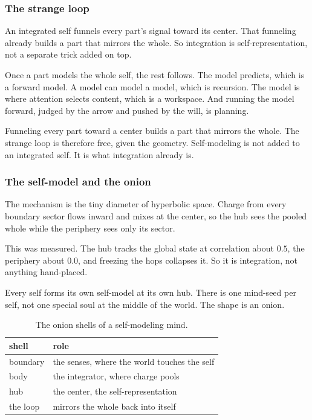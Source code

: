 \subsubsection{The strange loop}

An integrated self funnels every part's signal toward its center. That funneling already builds a part that mirrors the whole. So integration is self-representation, not a separate trick added on top.

Once a part models the whole self, the rest follows. The model predicts, which is a forward model. A model can model a model, which is recursion. The model is where attention selects content, which is a workspace. And running the model forward, judged by the arrow and pushed by the will, is planning.

\begin{principle}
Funneling every part toward a center builds a part that mirrors the whole. The strange loop is therefore free, given the geometry. Self-modeling is not added to an integrated self. It is what integration already is.
\end{principle}

\subsubsection{The self-model and the onion}

The mechanism is the tiny diameter of hyperbolic space. Charge from every boundary sector flows inward and mixes at the center, so the hub sees the pooled whole while the periphery sees only its sector.

This was measured. The hub tracks the global state at correlation about $0.5$, the periphery about $0.0$, and freezing the hops collapses it. So it is integration, not anything hand-placed.

Every self forms its own self-model at its own hub. There is one mind-seed per self, not one special soul at the middle of the world. The shape is an onion.

\begin{table}[ht]
\centering
\begin{tabular}{@{}ll@{}}
\toprule
shell & role \\
\midrule
boundary & the senses, where the world touches the self \\
body & the integrator, where charge pools \\
hub & the center, the self-representation \\
the loop & mirrors the whole back into itself \\
\bottomrule
\end{tabular}
\caption{The onion shells of a self-modeling mind.}
\label{tab:onion}
\end{table}

